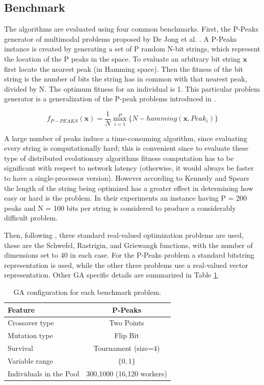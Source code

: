 \documentclass{sig-alternate}
\begin{document}
\subsection{Benchmark}
\label{ss:benchmark}
The algorithms are evaluated using four common benchmarks.
First, the P-Peaks generator of multimodal problems proposed by De Jong et al. \cite{Jong:PS97}.
A P-Peaks instance is created by generating a set of P random N-bit
strings, which represent the location of the P peaks in the space. To
evaluate an arbitrary bit string \begin{math} \mathbf{x} \end{math}
first locate the nearest peak (in Hamming space). Then the fitness of
the bit string is the number of bits the string has in common with
that nearest peak, divided by N. The optimum fitness for an individual
is 1. This particular problem generator is a generalization of the
P-peak problems introduced in \cite{Jong:1990}.            

\begin{equation}
f_{P-PEAKS}(\mathbf{x})=\frac{1}{N} \overset{P}{\max_{i=1}} \{N-hamming(\mathbf{x},Peak_i)   \}
\end{equation}

A large number of peaks induce a time-consuming algorithm,
since evaluating every string is computationally hard; this is
convenient since to evaluate these type of distributed evolutionary
algorithms fitness computation has to be significant with respect to
network latency (otherwise, it would always be faster to have a
single-processor version). However
according to Kennedy and Spears \cite{Kennedy:1998ch} the length of
the string being optimized has a greater effect in determining how
easy or hard is the problem. In their experiments an instance having P
= 200 peaks and N = 100 bits per string is considered to produce a
considerably difficult problem.

Then, following \cite{fuku1}, three standard real-valued optimization problems are used,
these are the Schwefel, Rastrigin, and Griewangk functions, with the number of dimensions set to
40 in each case. 
For the P-Peaks problem a standard bitstring representation is used, while the other three problems use a real-valued
vector representation.
Other GA specific details are summarized in Table \ref{tab:ga}.

\begin{table}[!t]
\caption{GA configuration for each benchmark problem.}
\label{tab:ga}
\centering
\begin{tabular}{|l|c|}
\hline
\textbf{Feature} & \textbf{P-Peaks}  \\
\hline
\hline
Crossover type & Two Points  \\
Mutation type & Flip Bit \\
Survival & Tournament (size=4) \\
Variable range & $\{0,1\}$  \\
Individuals in the Pool & 300,1000  (16,120 workers) \\
\hline
\end{tabular}
\end{table}
\end{document}
